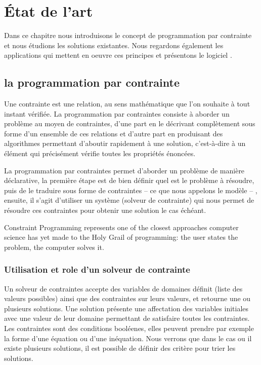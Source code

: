 \chapter{État de l'art}
Dans ce chapitre nous introduisons le concept de programmation par contrainte et nous étudions les solutions existantes. Nous regardons également les applications qui mettent en oeuvre ces principes et présentons le logiciel \iscore{}.
\section{la programmation par contrainte}
\begin{citeauteur}
Une contrainte est une relation, au sens mathématique que l’on souhaite à tout instant vérifiée. La programmation par contraintes consiste à aborder un problème au moyen de contraintes, d’une part en le décrivant complètement sous forme d’un ensemble de ces relations et d’autre part en produisant des algorithmes permettant d’aboutir rapidement à une solution, c'est-à-dire à un élément qui précisément vérifie toutes les propriétés énoncées.
\end{citeauteur}

La programmation par contraintes permet d'aborder un problème de manière déclarative, la première étape est de bien définir quel est le problème à résoudre, puis de le traduire sous forme de contraintes -- ce que nous appelons le modèle -- , ensuite, il s'agit d'utiliser un système (solveur de contrainte) qui nous permet de résoudre ces contraintes pour obtenir une solution le cas échéant.

\begin{citeauteur}
Constraint Programming represents one of the closest approaches computer science has yet made to the Holy Grail of programming: the user states the problem, the computer solves it.
\end{citeauteur}

\subsection{Utilisation et role d'un solveur de contrainte}

Un solveur de contraintes accepte des variables de domaines définit (liste des valeurs possibles) ainsi que des contraintes sur leurs valeurs, et retourne une ou plusieurs solutions.
Une solution présente une affectation des variables initiales avec une valeur de leur domaine permettant de satisfaire toutes les contraintes.
Les contraintes sont des conditions booléenes, elles peuvent prendre par exemple la forme d'une équation ou d'une inéquation.
Nous verrons que dans le cas ou il existe plusieurs solutions, il est possible de définir des critère pour trier les solutions.

